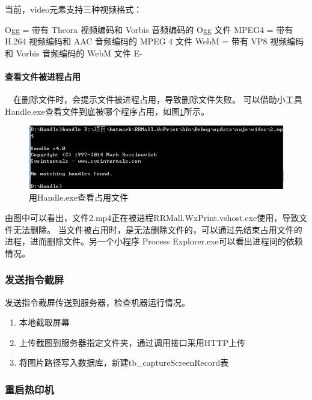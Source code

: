\documentclass{book}
\begin{document}
当前，video元素支持三种视频格式：

\noindent Ogg = 带有 Theora 视频编码和 Vorbis 音频编码的 Ogg 文件\newline
MPEG4 = 带有 H.264 视频编码和 AAC 音频编码的 MPEG 4 文件\newline
WebM = 带有 VP8 视频编码和 Vorbis 音频编码的 WebM 文件\newline
E-
\paragraph{查看文件被进程占用}~~在删除文件时，会提示文件被进程占用，导致删除文件失败。
可以借助小工具Handle.exe查看文件到底被哪个程序占用，如图\ref{HandleDetectUsingFileProcess}所示。

\begin{figure}[htbp]
	\centering
	\includegraphics[scale=0.8]{HandleDetectUsingFileProcess.jpg}
	\caption{用Handle.exe查看占用文件}
	\label{HandleDetectUsingFileProcess}
\end{figure}

由图中可以看出，文件2.mp4正在被进程RRMall.WxPrint.vshost.exe使用，导致文件无法删除。
当文件被占用时，是无法删除文件的，可以通过先结束占用文件的进程，进而删除文件。另一个小程序
Process Explorer.exe可以看出进程间的依赖情况。

\subsubsection{发送指令截屏}
发送指令截屏传送到服务器，检查机器运行情况。

\begin{enumerate}
\setcounter{enumi}{0}
\item{本地截取屏幕}
\item{上传截图到服务器指定文件夹，通过调用接口采用HTTP上传}
\item{将图片路径写入数据库，新建tb\_captureScreenRecord表}
\end{enumerate}

\subsubsection{重启热印机}
\end{document}
